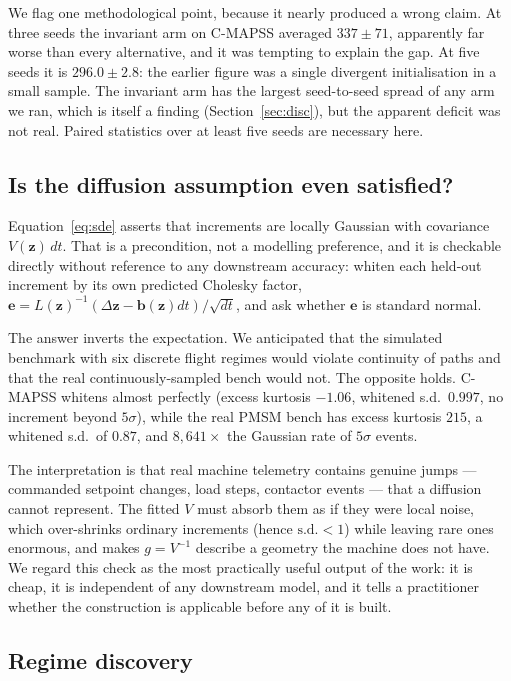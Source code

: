 \documentclass[11pt]{article}
\newcommand{\z}{\bm{z}}
\begin{document}
We flag one methodological point, because it nearly produced a wrong claim. At
three seeds the invariant arm on C-MAPSS averaged $337\pm71$, apparently far
worse than every alternative, and it was tempting to explain the gap. At five
seeds it is $296.0\pm2.8$: the earlier figure was a single divergent
initialisation in a small sample. The invariant arm has the largest
seed-to-seed spread of any arm we ran, which is itself a finding
(Section~\ref{sec:disc}), but the apparent deficit was not real. Paired
statistics over at least five seeds are necessary here.

\subsection{Is the diffusion assumption even satisfied?}
\label{sec:precondition}

Equation~\eqref{eq:sde} asserts that increments are locally Gaussian with
covariance $V(\z)\,dt$. That is a precondition, not a modelling preference, and
it is checkable directly without reference to any downstream accuracy: whiten
each held-out increment by its own predicted Cholesky factor,
$\bm{e}=L(\z)^{-1}(\Delta\z-\bm{b}(\z)dt)/\sqrt{dt}$, and ask whether $\bm{e}$
is standard normal.


The answer inverts the expectation. We anticipated that the simulated benchmark
with six discrete flight regimes would violate continuity of paths and that the
real continuously-sampled bench would not. The opposite holds. C-MAPSS whitens
almost perfectly (excess kurtosis $-1.06$, whitened s.d.\ $0.997$, no
increment beyond $5\sigma$), while the real PMSM bench has excess kurtosis
$215$, a whitened s.d.\ of $0.87$, and $8{,}641\times$ the Gaussian rate of
$5\sigma$ events.

The interpretation is that real machine telemetry contains genuine jumps ---
commanded setpoint changes, load steps, contactor events --- that a diffusion
cannot represent. The fitted $V$ must absorb them as if they were local noise,
which over-shrinks ordinary increments (hence $\mathrm{s.d.}<1$) while leaving
rare ones enormous, and makes $g=V^{-1}$ describe a geometry the machine does
not have. We regard this check as the most practically useful output of the
work: it is cheap, it is independent of any downstream model, and it tells a
practitioner whether the construction is applicable before any of it is built.

\subsection{Regime discovery}
\end{document}
